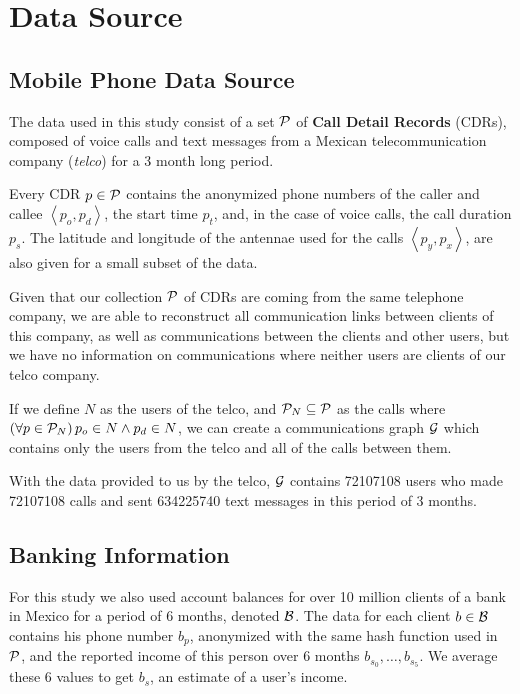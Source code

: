 \section{Data Source}

\subsection{Mobile Phone Data Source}

The data used in this study consist of a set \( \mathcal{P} \) of \textbf{Call Detail Records} (CDRs), composed of voice calls and text messages from a Mexican telecommunication company (\textit{telco}) for a 3 month long period.

Every CDR \( p \in \mathcal{P} \)  contains the anonymized phone numbers of the caller and callee \( \left< p_o, p_d \right> \), the start time \( p_t \), and, in the case of voice calls, the call duration \( p_s \). The latitude and longitude of the antennae used for the calls \( \left< p_y, p_x \right> \), are also given for a small subset of the data.

Given that our collection \( \mathcal{P} \) of CDRs are coming from the same telephone company, we are able to reconstruct all communication links between clients of this company, as well as communications between the clients and other users, but we have no information on communications where neither users are clients of our telco company.

If we define \( N \) as the users of the telco, and \( \mathcal{P}_N \subseteq \mathcal{P} \) as the calls where \( \left( \forall p \in \mathcal{P}_N \right) p_o \in N \wedge p_d \in N \), we can create a communications graph \( \mathcal{G} \) which contains only the users from the telco and all of the calls between them.

With the data provided to us by the telco, \( \mathcal{G} \) contains \num{72107108} users who made \num{72107108} calls and sent \num{634225740} text messages in this period of 3 months.

\subsection{Banking Information}

For this study we also used account balances for over 10 million clients of a bank in Mexico for a period of 6 months, denoted \( \mathcal{B} \). The data for each client \( b \in \mathcal{B} \) contains his phone number \( b_p \), anonymized with the same hash function used in \( \mathcal{P} \), and the reported income of this person over 6 months \( b_{s_0}, \ldots, b_{s_5} \). We average these 6 values to get \( b_s \), an estimate of a user's income.

